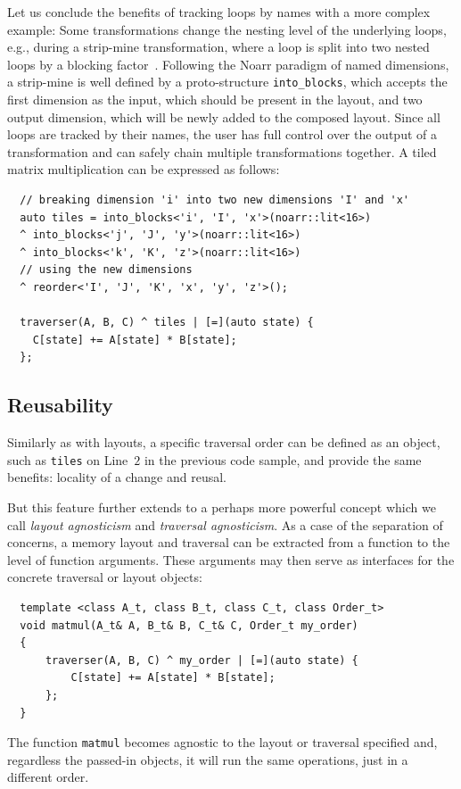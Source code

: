 Let us conclude the benefits of tracking loops by names with a more complex example:
Some transformations change the nesting level of the underlying loops, e.g., during a strip-mine transformation, where a loop is split into two nested loops by a blocking factor~\cite{mckinley1996improving}. Following the Noarr paradigm of named dimensions, a strip-mine is well defined by a proto-structure \texttt{into_blocks}, which accepts the first dimension as the input, which should be present in the layout, and two output dimension, which will be newly added to the composed layout. Since all loops are tracked by their names, the user has full control over the output of a transformation and can safely chain multiple transformations together. A tiled matrix multiplication can be expressed as follows:
\begin{verbatim}
  // breaking dimension 'i' into two new dimensions 'I' and 'x'
  auto tiles = into_blocks<'i', 'I', 'x'>(noarr::lit<16>)
  ^ into_blocks<'j', 'J', 'y'>(noarr::lit<16>)
  ^ into_blocks<'k', 'K', 'z'>(noarr::lit<16>)
  // using the new dimensions
  ^ reorder<'I', 'J', 'K', 'x', 'y', 'z'>(); 

  traverser(A, B, C) ^ tiles | [=](auto state) {
    C[state] += A[state] * B[state];
  }; 
\end{verbatim}

\subsection{Reusability}

Similarly as with layouts, a specific traversal order can be defined as an object, such as \texttt{tiles} on Line~$2$ in the previous code sample, and provide the same benefits: locality of a change and reusal.

But this feature further extends to a perhaps more powerful concept which we call \emph{layout agnosticism} and \emph{traversal agnosticism}. As a case of the separation of concerns, a memory layout and traversal can be extracted from a function to the level of function arguments. These arguments may then serve as interfaces for the concrete traversal or layout objects:

\begin{verbatim}
  template <class A_t, class B_t, class C_t, class Order_t>
  void matmul(A_t& A, B_t& B, C_t& C, Order_t my_order) 
  {
      traverser(A, B, C) ^ my_order | [=](auto state) {
          C[state] += A[state] * B[state];
      };
  }
\end{verbatim}
The function \texttt{matmul} becomes agnostic to the layout or traversal specified and, regardless the passed-in objects, it will run the same operations, just in a different order. 

